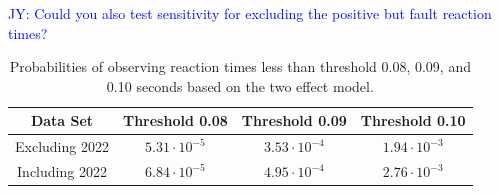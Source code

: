 \documentclass[12pt, letterpaper]{article}
\newcommand{\jy}[1]{\textcolor{blue}{JY: #1}}
\begin{document}


\jy{Could you also test sensitivity for excluding the positive but 
  fault reaction times?}

\begin{table}
  \centering
  \caption{Probabilities of observing reaction times less than threshold 0.08,
  0.09, and 0.10 seconds based on the two effect model.}
  \begin{tabular}{c c c c} 
   \toprule
   Data Set & Threshold 0.08 & Threshold 0.09 & Threshold 0.10  \\ 
   \midrule
   Excluding 2022 & $5.31\cdot10^{-5}$ & $3.53\cdot10^{-4}$ &  $1.94\cdot10^{-3}$  \\ 
   Including 2022 & $6.84\cdot10^{-5}$ & $4.95\cdot10^{-4}$ & $2.76\cdot10^{-3}$ \\
   \bottomrule
  \end{tabular}
  \label{tab:Sim_probability}
\end{table}
\end{document}
